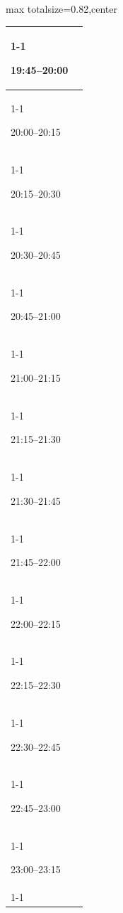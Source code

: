 \documentclass[11pt,a4paper]{article}
\begin{document}
\begin{center}
\begin{adjustbox}{max totalsize={\textwidth}{0.82\textheight},center}
\begin{tabular}{|p{3.6cm}|p{11cm}|}
\cline{1-1}
{\centering\rule{0pt}{2.80ex}19:45--20:00} & {\centering\rule{0pt}{2.80ex}} \\
\cline{1-1}
{\centering\rule{0pt}{2.80ex}20:00--20:15} & {\centering\rule{0pt}{2.80ex}} \\
\cline{1-1}
{\centering\rule{0pt}{2.80ex}20:15--20:30} & {\centering\rule{0pt}{2.80ex}} \\
\cline{1-1}
{\centering\rule{0pt}{2.80ex}20:30--20:45} & {\centering\rule{0pt}{2.80ex}} \\
\cline{1-1}
{\centering\rule{0pt}{2.80ex}20:45--21:00} & {\centering\rule{0pt}{2.80ex}} \\
\cline{1-1}
{\centering\rule{0pt}{2.80ex}21:00--21:15} & {\centering\rule{0pt}{2.80ex}} \\
\cline{1-1}
{\centering\rule{0pt}{2.80ex}21:15--21:30} & {\centering\rule{0pt}{2.80ex}} \\
\cline{1-1}
{\centering\rule{0pt}{2.80ex}21:30--21:45} & {\centering\rule{0pt}{2.80ex}} \\
\cline{1-1}
{\centering\rule{0pt}{2.80ex}21:45--22:00} & {\centering\rule{0pt}{2.80ex}} \\
\cline{1-1}
{\centering\rule{0pt}{2.80ex}22:00--22:15} & {\centering\rule{0pt}{2.80ex}} \\
\cline{1-1}
{\centering\rule{0pt}{2.80ex}22:15--22:30} & {\centering\rule{0pt}{2.80ex}} \\
\cline{1-1}
{\centering\rule{0pt}{2.80ex}22:30--22:45} & {\centering\rule{0pt}{2.80ex}} \\
\cline{1-1}
{\centering\rule{0pt}{2.80ex}22:45--23:00} & {\centering\rule{0pt}{2.80ex}} \\
\cline{1-1}
{\centering\rule{0pt}{2.80ex}23:00--23:15} & {\centering\rule{0pt}{2.80ex}} \\
\cline{1-1}
\hline
\end{tabular}
\end{adjustbox}
\end{center}

\clearpage
\end{document}
